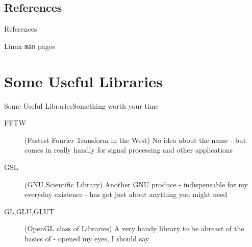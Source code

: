 \documentclass{beamer}
\begin{document}
\subsection*{References}
\begin{frame}[fragile]{References}
\begin{thebibliography}{2}
 Linux \verb|man| pages
\end{thebibliography}
\end{frame}

\section{Some Useful Libraries}
\begin{frame}{Some Useful Libraries}{Something worth your time}
\begin{description}
\item[FFTW] (Fastest Fourier Transform in the West) No idea about the name - but comes in really handly for signal processing and other applications
\item[GSL] (GNU Scientific Library) Another GNU produce - indispensable for my everyday existence - has got just about anything you might need
\item[GL,GLU,GLUT] (OpenGL class of Libraries) A very handy library to be abreast of the basics of - opened my eyes, I should say
\end{description}
\end{frame}
\end{document}
